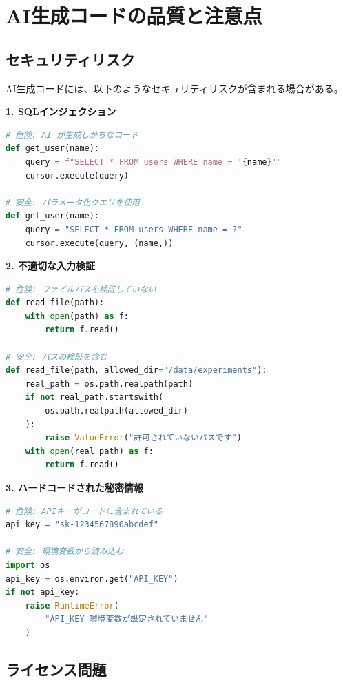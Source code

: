 \section{AI生成コードの品質と注意点}
\label{sec:6.7}

\subsection{セキュリティリスク}

AI生成コードには、以下のようなセキュリティリスクが含まれる場合がある。

\textbf{1. SQLインジェクション}

\begin{lstlisting}[language=Python]
# 危険: AI が生成しがちなコード
def get_user(name):
    query = f"SELECT * FROM users WHERE name = '{name}'"
    cursor.execute(query)

# 安全: パラメータ化クエリを使用
def get_user(name):
    query = "SELECT * FROM users WHERE name = ?"
    cursor.execute(query, (name,))
\end{lstlisting}

\textbf{2. 不適切な入力検証}

\begin{lstlisting}[language=Python]
# 危険: ファイルパスを検証していない
def read_file(path):
    with open(path) as f:
        return f.read()

# 安全: パスの検証を含む
def read_file(path, allowed_dir="/data/experiments"):
    real_path = os.path.realpath(path)
    if not real_path.startswith(
        os.path.realpath(allowed_dir)
    ):
        raise ValueError("許可されていないパスです")
    with open(real_path) as f:
        return f.read()
\end{lstlisting}

\textbf{3. ハードコードされた秘密情報}

\begin{lstlisting}[language=Python]
# 危険: APIキーがコードに含まれている
api_key = "sk-1234567890abcdef"

# 安全: 環境変数から読み込む
import os
api_key = os.environ.get("API_KEY")
if not api_key:
    raise RuntimeError(
        "API_KEY 環境変数が設定されていません"
    )
\end{lstlisting}

\subsection{ライセンス問題}

